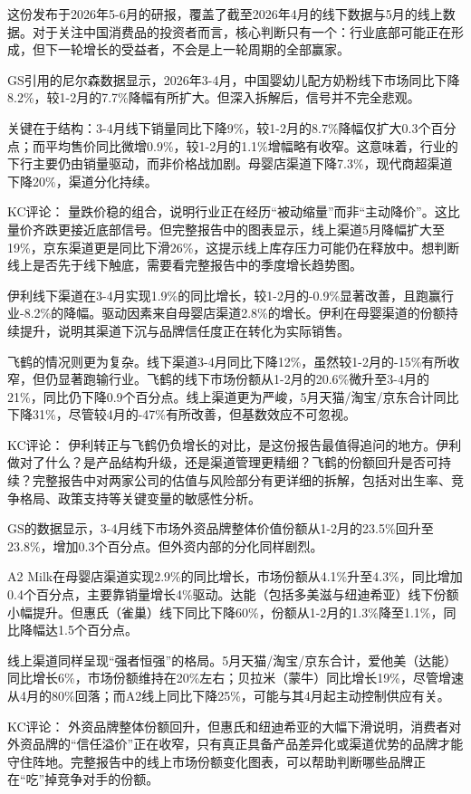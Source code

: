 \documentclass[11pt]{ctexart}
\begin{document}
这份发布于2026年5-6月的研报，覆盖了截至2026年4月的线下数据与5月的线上数据。对于关注中国消费品的投资者而言，核心判断只有一个：行业底部可能正在形成，但下一轮增长的受益者，不会是上一轮周期的全部赢家。

GS引用的尼尔森数据显示，2026年3-4月，中国婴幼儿配方奶粉线下市场同比下降8.2\%，较1-2月的7.7\%降幅有所扩大。但深入拆解后，信号并不完全悲观。

关键在于结构：3-4月线下销量同比下降9\%，较1-2月的8.7\%降幅仅扩大0.3个百分点；而平均售价同比微增0.9\%，较1-2月的1.1\%增幅略有收窄。这意味着，行业的下行主要仍由销量驱动，而非价格战加剧。母婴店渠道下降7.3\%，现代商超渠道下降20\%，渠道分化持续。

KC评论： 量跌价稳的组合，说明行业正在经历“被动缩量”而非“主动降价”。这比量价齐跌更接近底部信号。但完整报告中的图表显示，线上渠道5月降幅扩大至19\%，京东渠道更是同比下滑26\%，这提示线上库存压力可能仍在释放中。想判断线上是否先于线下触底，需要看完整报告中的季度增长趋势图。

伊利线下渠道在3-4月实现1.9\%的同比增长，较1-2月的-0.9\%显著改善，且跑赢行业-8.2\%的降幅。驱动因素来自母婴店渠道2.8\%的增长。伊利在母婴渠道的份额持续提升，说明其渠道下沉与品牌信任度正在转化为实际销售。

飞鹤的情况则更为复杂。线下渠道3-4月同比下降12\%，虽然较1-2月的-15\%有所收窄，但仍显著跑输行业。飞鹤的线下市场份额从1-2月的20.6\%微升至3-4月的21\%，同比仍下降0.9个百分点。线上渠道更为严峻，5月天猫/淘宝/京东合计同比下降31\%，尽管较4月的-47\%有所改善，但基数效应不可忽视。

KC评论： 伊利转正与飞鹤仍负增长的对比，是这份报告最值得追问的地方。伊利做对了什么？是产品结构升级，还是渠道管理更精细？飞鹤的份额回升是否可持续？完整报告中对两家公司的估值与风险部分有更详细的拆解，包括对出生率、竞争格局、政策支持等关键变量的敏感性分析。

GS的数据显示，3-4月线下市场外资品牌整体价值份额从1-2月的23.5\%回升至23.8\%，增加0.3个百分点。但外资内部的分化同样剧烈。

A2 Milk在母婴店渠道实现2.9\%的同比增长，市场份额从4.1\%升至4.3\%，同比增加0.4个百分点，主要靠销量增长4\%驱动。达能（包括多美滋与纽迪希亚）线下份额小幅提升。但惠氏（雀巢）线下同比下降60\%，份额从1-2月的1.3\%降至1.1\%，同比降幅达1.5个百分点。

线上渠道同样呈现“强者恒强”的格局。5月天猫/淘宝/京东合计，爱他美（达能）同比增长6\%，市场份额维持在20\%左右；贝拉米（蒙牛）同比增长19\%，尽管增速从4月的80\%回落；而A2线上同比下降25\%，可能与其4月起主动控制供应有关。

KC评论： 外资品牌整体份额回升，但惠氏和纽迪希亚的大幅下滑说明，消费者对外资品牌的“信任溢价”正在收窄，只有真正具备产品差异化或渠道优势的品牌才能守住阵地。完整报告中的线上市场份额变化图表，可以帮助判断哪些品牌正在“吃”掉竞争对手的份额。
\end{document}
